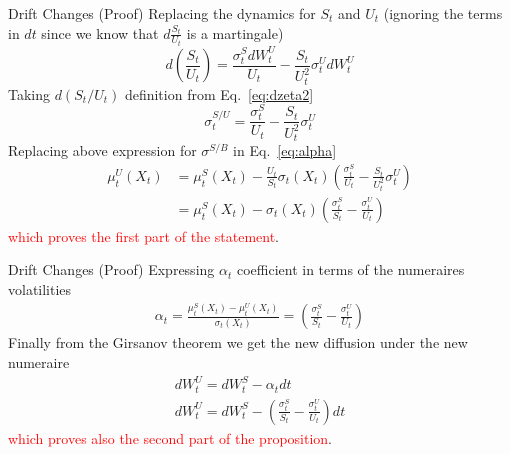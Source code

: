 \documentclass{beamer}
\begin{document}
\begin{frame}{Drift Changes (Proof)}
	Replacing the dynamics for $S_t$ and $U_t$ (ignoring the terms in $dt$ since we know that $d\frac{S_t}{U_t}$ is a martingale)
	\begin{equation}
		d\left(\frac{S_t}{U_t}\right) = \frac{\sigma^S_t dW^U_t}{U_t} - \frac{S_t}{U^2_t}\sigma^U_t dW^U_t
	\end{equation}
	Taking $d(S_t/U_t)$ definition from Eq.~\ref{eq:dzeta2}
	\begin{equation}
	\sigma_t^{S/U} = \frac{\sigma^S_t}{U_t} - \frac{S_t}{U^2_t}\sigma^U_t
	\end{equation}
	Replacing above expression for $\sigma^{S/B}$ in Eq.~\ref{eq:alpha}
	\begin{equation}
		\begin{aligned}
			\mu_t^U(X_t)&=\mu_t^S(X_t)-\frac{U_t}{S_t}\sigma_t(X_t)\left(\frac{\sigma^S_t}{U_t} - \frac{S_t}{U^2_t}\sigma^U_t\right)\\
			&=\mu_t^S(X_t)-\sigma_t(X_t)\left(\frac{\sigma^S_t}{S_t} - \frac{\sigma^U_t}{U_t}\right)
		\end{aligned}
	\end{equation}
	\textcolor{red}{which proves the first part of the statement}.
\end{frame}

\begin{frame}{Drift Changes (Proof)}
	Expressing $\alpha_t$ coefficient in terms of the numeraires volatilities
	\begin{equation}
	\begin{aligned}
		\alpha_t = \frac{\mu_t^S(X_t) - \mu_t^U(X_t)}{\sigma_t(X_t)} = \left(\frac{\sigma^S_t}{S_t} - \frac{\sigma^U_t}{U_t}\right)
	\end{aligned}
	\end{equation}
	Finally from the Girsanov theorem we get the new diffusion under the new numeraire
	\begin{equation}
		\begin{gathered}
		dW^U_t = dW^S_t - \alpha_t dt \\
		dW^U_t = dW^S_t - \left(\frac{\sigma^S_t}{S_t}-\frac{\sigma^U_t}{U_t}\right) dt
		\end{gathered}
	\end{equation}
	\textcolor{red}{which proves also the second part of the proposition}.
	
\end{frame}
\end{document}
